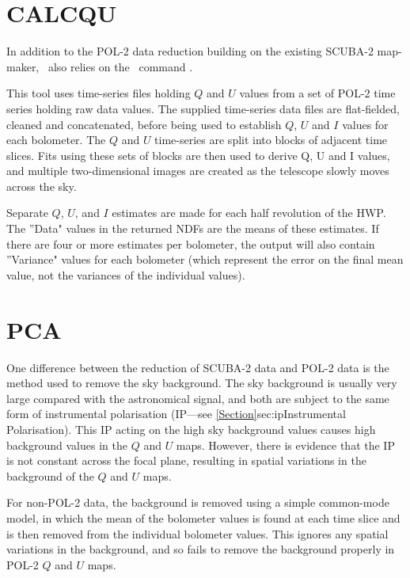 \section{CALCQU}
\label{sec:calcqu}

In addition to the POL-2 data reduction building on the
existing SCUBA-2 map-maker, \poltwomap\ also relies on the \SMURF\
command .

This  tool uses time-series files holding $Q$
and $U$ values from a set of POL-2 time series holding raw data values.
The supplied time-series data files are flat-fielded, cleaned and concatenated,
before being used to establish $Q$, $U$ and $I$ values for each bolometer. The $Q$
and $U$ time-series are split into blocks of adjacent time slices. Fits
using these sets of blocks are then used to derive Q, U and I values, and
multiple two-dimensional images are created as the telescope slowly moves across the sky.

Separate $Q$, $U$, and $I$ estimates are made for each half revolution of the HWP.
The ''Data" values in the returned NDFs are the means of these estimates. If
there are four or more estimates per bolometer, the output will also contain
''Variance" values for each bolometer (which represent the error on
the final mean value, not the variances of the individual values).

\section{PCA}
\label{sec:pca}

One difference between the reduction of SCUBA-2 data and POL-2 data is the
method used to remove the sky background.  The sky background is usually
very large compared with the astronomical signal, and both are subject to
the same form of instrumental polarisation (IP---see
\cref{Section}{sec:ip}{Instrumental Polarisation}). This
IP acting on the high sky background values causes high background values
in the $Q$ and $U$ maps. However, there is evidence that the IP is not
constant across the focal plane, resulting in spatial variations in the
background of the $Q$ and $U$ maps.

For non-POL-2 data, the background is removed using a simple common-mode
model, in which the mean of the bolometer values is found at each time
slice and is then removed from the individual bolometer values. This
ignores any spatial variations in the background, and so fails to remove
the background properly in POL-2 $Q$ and $U$ maps.


